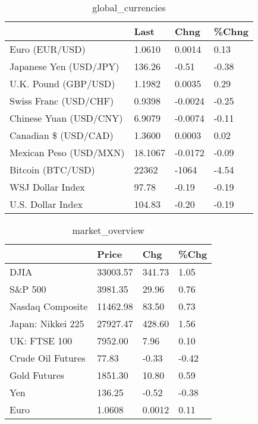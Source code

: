 \documentclass{article}%
\begin{document}
%


\begin{table}[htbp]%
\caption{global\_currencies}%
\centering%
\begin{adjustbox}{width=1\textwidth}%
\begin{tabular}{llll}
\toprule
                       &    Last &    Chng & \%Chng \\
\midrule
        Euro (EUR/USD) &  1.0610 &  0.0014 &  0.13 \\
Japanese Yen (USD/JPY) &  136.26 &   -0.51 & -0.38 \\
  U.K. Pound (GBP/USD) &  1.1982 &  0.0035 &  0.29 \\
 Swiss Franc (USD/CHF) &  0.9398 & -0.0024 & -0.25 \\
Chinese Yuan (USD/CNY) &  6.9079 & -0.0074 & -0.11 \\
  Canadian \$ (USD/CAD) &  1.3600 &  0.0003 &  0.02 \\
Mexican Peso (USD/MXN) & 18.1067 & -0.0172 & -0.09 \\
     Bitcoin (BTC/USD) &   22362 &   -1064 & -4.54 \\
      WSJ Dollar Index &   97.78 &   -0.19 & -0.19 \\
     U.S. Dollar Index &  104.83 &   -0.20 & -0.19 \\
\bottomrule
\end{tabular}
%
\end{adjustbox}%
\end{table}

%


\begin{table}[htbp]%
\caption{market\_overview}%
\centering%
\begin{adjustbox}{width=1\textwidth}%
\begin{tabular}{llll}
\toprule
                  &    Price &    Chg &  \%Chg \\
\midrule
             DJIA & 33003.57 & 341.73 &  1.05 \\
          S\&P 500 &  3981.35 &  29.96 &  0.76 \\
 Nasdaq Composite & 11462.98 &  83.50 &  0.73 \\
Japan: Nikkei 225 & 27927.47 & 428.60 &  1.56 \\
     UK: FTSE 100 &  7952.00 &   7.96 &  0.10 \\
Crude Oil Futures &    77.83 &  -0.33 & -0.42 \\
     Gold Futures &  1851.30 &  10.80 &  0.59 \\
              Yen &   136.25 &  -0.52 & -0.38 \\
             Euro &   1.0608 & 0.0012 &  0.11 \\
\bottomrule
\end{tabular}
%
\end{adjustbox}%
\end{table}

%
\end{document}
